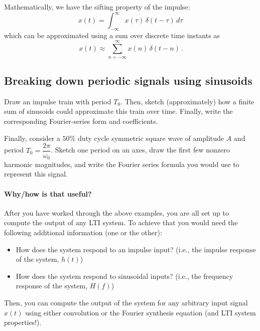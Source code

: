 \documentclass{ee102_notes}
\begin{document}
Mathematically, we have the sifting property of the impulse:
\[\,x(t)=\int_{-\infty}^{\infty} x(\tau)\,\delta(t-\tau)\,d\tau\,
\] 
which can be approximated using a sum over discrete time instants as
\[
\,x(t)\approx \sum_{n=-\infty}^{\infty} x(n)\,\delta(t-n)\, .
\]

\subsection{Breaking down periodic signals using sinusoids}
Draw an impulse train with period $T_0$. Then, sketch (approximately) how a finite sum of sinusoids could approximate this train over time. Finally, write the corresponding Fourier-series form and coefficients.



Finally, consider a $50\%$ duty cycle symmetric square wave of amplitude $A$ and period $T_0=\dfrac{2\pi}{\omega_0}$. Sketch one period on an axes, draw the first few nonzero harmonic magnitudes, and write the Fourier series formula you would use to represent this signal.


\paragraph{Why/how is that useful?}

After you have worked through the above examples, you are all set up to compute the output of any LTI system. To achieve that you would need the following additional information (one or the other): 
\begin{itemize}
    \item How does the system respond to an impulse input? (i.e., the impulse response of the system, $h(t)$)
    \item How does the system respond to sinusoidal inputs? (i.e., the frequency response of the system, $H(f)$)
\end{itemize}
Then, you can compute the output of the system for any arbitrary input signal $x(t)$ using either convolution or the Fourier synthesis equation (and LTI system properties!).
\end{document}
